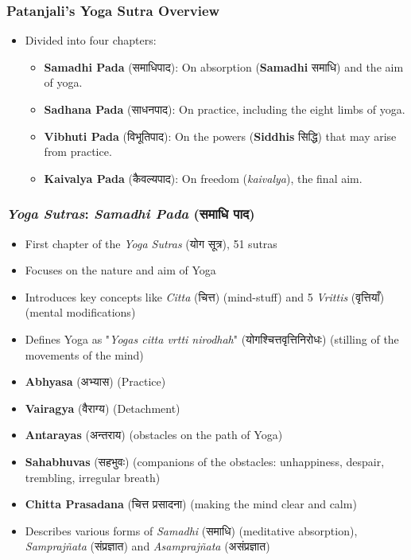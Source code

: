 \begin{frame}[fragile]\frametitle{Patanjali's Yoga Sutra Overview}
    \begin{itemize}
        \item Divided into four chapters:
        \begin{itemize}
            \item \textbf{Samadhi Pada} (समाधिपाद): On absorption (\textbf{Samadhi} समाधि) and the aim of yoga.
            \item \textbf{Sadhana Pada} (साधनपाद): On practice, including the eight limbs of yoga.
            \item \textbf{Vibhuti Pada} (विभूतिपाद): On the powers (\textbf{Siddhis} सिद्धि) that may arise from practice.
            \item \textbf{Kaivalya Pada} (कैवल्यपाद): On freedom (\textit{kaivalya}), the final aim.
        \end{itemize}
    \end{itemize}
\end{frame}

\begin{frame}[fragile]\frametitle{\textit{Yoga Sutras}: \textit{Samadhi Pada} (समाधि पाद)}

    \begin{itemize}
        \item First chapter of the \textit{Yoga Sutras} (योग सूत्र), 51 sutras
        \item Focuses on the nature and aim of Yoga
        \item Introduces key concepts like \textit{Citta} (चित्त) (mind-stuff) and 5 \textit{Vrittis} (वृत्तियाँ) (mental modifications)
        \item Defines Yoga as "\textit{Yogas citta vrtti nirodhah}" (योगश्चित्तवृत्तिनिरोधः) (stilling of the movements of the mind)
        \item \textbf{Abhyasa} (अभ्यास) (Practice)
        \item \textbf{Vairagya} (वैराग्य) (Detachment)
        \item \textbf{Antarayas} (अन्तराय) (obstacles on the path of Yoga)
        \item \textbf{Sahabhuvas} (सहभुवः) (companions of the obstacles: unhappiness, despair, trembling, irregular breath)
        \item \textbf{Chitta Prasadana} (चित्त प्रसादना) (making the mind clear and calm)
        \item Describes various forms of \textit{Samadhi} (समाधि) (meditative absorption), \textit{Samprajñata} (संप्रज्ञात) and \textit{Asamprajñata} (असंप्रज्ञात)
    \end{itemize}

\end{frame}



